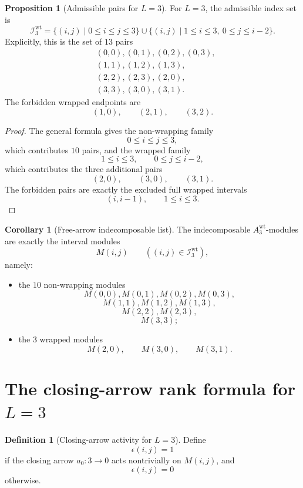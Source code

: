 \documentclass{article}
\theoremstyle{definition}
\newtheorem{proposition}[theorem]{Proposition}
\newtheorem{corollary}[theorem]{Corollary}
\newtheorem{definition}[theorem]{Definition}
\begin{document}
\begin{proposition}[Admissible pairs for $L=3$]
For $L=3$, the admissible index set is
\[
\mathcal I_3^{\mathrm{wt}}
=
\{(i,j)\mid 0\le i\le j\le 3\}
\cup
\{(i,j)\mid 1\le i\le 3,\ 0\le j\le i-2\}.
\]
Explicitly, this is the set of $13$ pairs
\[
\begin{aligned}
&(0,0),(0,1),(0,2),(0,3),\\
&(1,1),(1,2),(1,3),\\
&(2,2),(2,3),(2,0),\\
&(3,3),(3,0),(3,1).
\end{aligned}
\]
The forbidden wrapped endpoints are
\[
(1,0),\qquad (2,1),\qquad (3,2).
\]
\end{proposition}

\begin{proof}
The general formula gives the non-wrapping family
\[
0\le i\le j\le 3,
\]
which contributes $10$ pairs, and the wrapped family
\[
1\le i\le 3,\qquad 0\le j\le i-2,
\]
which contributes the three additional pairs
\[
(2,0),\qquad (3,0),\qquad (3,1).
\]
The forbidden pairs are exactly the excluded full wrapped intervals
\[
(i,i-1),
\qquad
1\le i\le 3.
\]
\end{proof}

\begin{corollary}[Free-arrow indecomposable list]
The indecomposable $A_3^{\mathrm{wt}}$-modules are exactly the interval modules
\[
M(i,j)
\qquad
((i,j)\in \mathcal I_3^{\mathrm{wt}}),
\]
namely:

\begin{itemize}
\item the $10$ non-wrapping modules
  \[
  M(0,0),M(0,1),M(0,2),M(0,3),
  \]
  \[
  M(1,1),M(1,2),M(1,3),
  \]
  \[
  M(2,2),M(2,3),
  \]
  \[
  M(3,3);
  \]
\item the $3$ wrapped modules
  \[
  M(2,0),\qquad M(3,0),\qquad M(3,1).
  \]
\end{itemize}
\end{corollary}

\section{The closing-arrow rank formula for $L=3$}

\begin{definition}[Closing-arrow activity for $L=3$]
Define
\[
\epsilon(i,j)=1
\]
if the closing arrow $a_0:3\to 0$ acts nontrivially on $M(i,j)$, and
\[
\epsilon(i,j)=0
\]
otherwise.
\end{definition}
\end{document}
